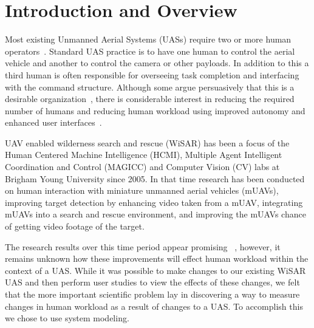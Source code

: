 \chapter{Introduction and Overview}

Most existing Unmanned Aerial Systems (UASs) require two or more human operators~\cite{GoodrichMorse2008,MurphyStoverPrattGriffin2006}. Standard UAS practice is to have one human to control the aerial vehicle and another to control the camera or other payloads. In addition to this a third human is often responsible for overseeing task completion and interfacing with the command structure. Although some argue persuasively that this is a desirable organization~\cite{MurphyBurke2010}, there is considerable interest in reducing the required number of humans and reducing human workload using improved autonomy and enhanced user interfaces~\cite{Cummings2007,MitchellCummings2005,goodrich2010fanout}.

UAV enabled wilderness search and rescue (WiSAR) has been a focus of the Human
Centered Machine Intelligence (HCMI), Multiple Agent Intelligent Coordination and Control (MAGICC) and Computer Vision (CV) labs at Brigham Young University since 2005.  In that time research has been conducted on human interaction with miniature unmanned aerial vehicles (mUAVs), improving target detection by enhancing video taken from a mUAV, integrating mUAVs into a search and rescue environment, and improving the mUAVs chance of getting video footage of the target.   

The research results over this time period appear promising ~\cite{cluff2009unified,cooper2007supporting,engh2008see,humphrey2009information,lin2010supporting,morse2008application,morse2010color,rasmussen2008enhancement}, however, it remains unknown how these improvements will effect human workload within the context of a UAS.  While it was possible to make changes to our existing WiSAR UAS and then perform user studies to view the effects of these changes, we felt that the more important scientific problem lay in discovering a way to measure changes in human workload as a result of changes to a UAS.  To accomplish this we chose to use system modeling. 

